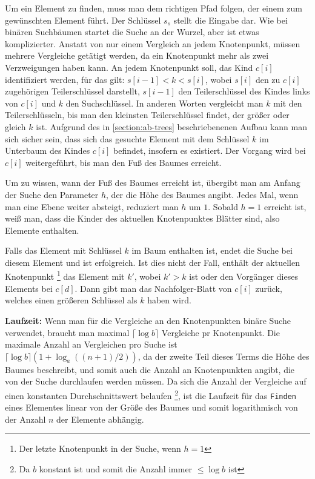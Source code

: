 Um ein Element zu finden, muss man dem richtigen Pfad folgen, der einem zum gewünschten Element führt. Der Schlüssel $s_s$ stellt die Eingabe dar. Wie bei binären Suchbäumen startet die Suche an der Wurzel, aber ist etwas komplizierter. Anstatt von nur einem Vergleich an jedem Knotenpunkt, müssen mehrere Vergleiche getätigt werden, da ein Knotenpunkt mehr als zwei Verzweigungen haben kann. An jedem Knotenpunkt soll, das Kind $c[i]$ identifiziert werden, für das gilt: $s[i-1] < k < s[i]$, wobei $s[i]$ den zu $c[i]$ zugehörigen Teilerschlüssel darstellt, $s[i-1]$ den Teilerschlüssel des Kindes links von $c[i]$ und $k$ den Suchschlüssel. In anderen Worten vergleicht man $k$ mit den Teilerschlüsseln, bis man den kleinsten Teilerschlüssel findet, der größer oder gleich $k$ ist. Aufgrund des in \autoref{section:ab-trees} beschriebenenen Aufbau kann man sich sicher sein, dass sich das gesuchte Element mit dem Schlüssel $k$ im Unterbaum des Kindes $c[i]$ befindet, insofern es existiert. Der Vorgang wird bei $c[i]$ weitergeführt, bis man den Fuß des Baumes erreicht.
\par
Um zu wissen, wann der Fuß des Baumes erreicht ist, übergibt man am Anfang der Suche den Parameter $h$, der die Höhe des Baumes angibt. Jedes Mal, wenn man eine Ebene weiter absteigt, reduziert man $h$ um $1$. Sobald $h = 1$ erreicht ist, weiß man, dass die Kinder des aktuellen Knotenpunktes Blätter sind, also Elemente enthalten.
\par
Falls das Element mit Schlüssel $k$ im Baum enthalten ist, endet die Suche bei diesem Element und ist erfolgreich. Ist dies nicht der Fall, enthält der aktuellen Knotenpunkt \footnote{Der letzte Knotenpunkt in der Suche, wenn $h = 1$} das Element mit $k'$, wobei $k' > k$ ist oder den Vorgänger dieses Elements bei $c[d]$. Dann gibt man das Nachfolger-Blatt von $c[i]$ zurück, welches einen größeren Schlüssel als $k$ haben wird.
\par
\textbf{Laufzeit: } Wenn man für die Vergleiche an den Knotenpunkten binäre Suche verwendet, braucht man maximal $\lceil \log b \rceil$ Vergleiche pr Knotenpunkt. Die maximale Anzahl an Vergleichen pro Suche ist $\lceil \log b \rceil (1+\log_a((n+1)/2))$, da der zweite Teil dieses Terms die Höhe des Baumes beschreibt, und somit auch die Anzahl an Knotenpunkten angibt, die von der Suche durchlaufen werden müssen. Da sich die Anzahl der Vergleiche auf einen konstanten Durchschnittswert belaufen \footnote{Da $b$ konstant ist und somit die Anzahl immer $\leq \log b$ ist}, ist die Laufzeit für das \texttt{Finden} eines Elementes linear von der Größe des Baumes und somit logarithmisch von der Anzahl $n$ der Elemente abhängig.\\
\cite{Sanders:19}

